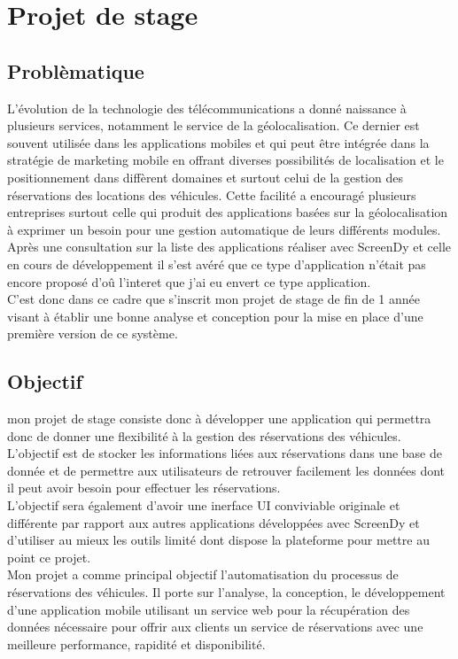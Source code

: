 \documentclass[12pt,a4paper]{report}
\begin{document}
	

		\chapter{Projet de stage}
		
		\section{Problèmatique}
L’évolution de la technologie des télécommunications a donné naissance à plusieurs services,
notamment le service de la géolocalisation. Ce dernier est souvent utilisée dans les applications
mobiles et qui peut être intégrée dans la stratégie de marketing mobile en offrant diverses possibilités
de localisation et le positionnement dans diffèrent domaines et surtout celui de la gestion des
réservations des locations des véhicules. Cette facilité a encouragé plusieurs entreprises surtout celle
qui produit des applications basées sur la géolocalisation à exprimer un besoin pour une gestion
automatique de leurs différents modules.\\
Après une consultation sur la liste des applications réaliser avec ScreenDy et celle en cours de développement il s'est avéré que ce type d'application n'était pas encore proposé d'oû l'interet que j'ai eu envert ce type application.\\
C’est donc dans ce cadre que s’inscrit mon projet de stage de fin de 1 ann\'ee visant à établir
une bonne analyse et conception pour la mise en place d’une première version de ce système.

		
		\section{Objectif}
	mon projet de stage consiste donc à développer une application qui permettra donc de donner
une flexibilité à la gestion des réservations des véhicules. L’objectif est de stocker les informations
liées aux réservations dans une base de donnée et de permettre aux utilisateurs de retrouver facilement les données dont il peut avoir besoin pour effectuer les réservations.\\
L’objectif sera également d’avoir une inerface UI conviviable originale et différente par rapport aux autres applications développées avec ScreenDy et d’utiliser au mieux les outils limité dont dispose la plateforme pour mettre au point ce projet.\\
Mon projet a comme principal objectif l’automatisation du processus de réservations des
véhicules. Il porte sur l’analyse, la conception, le développement d’une application mobile utilisant
un service web pour la récupération des données nécessaire pour offrir aux clients un service de
réservations avec une meilleure performance, rapidité et disponibilité.\\
\end{document}
